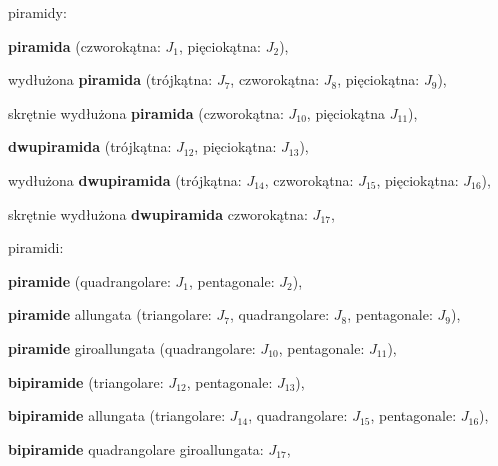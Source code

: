 \begin{compactitem}
    \item piramidy: \begin{compactitem} %
        \item \textbf{piramida} (czworokątna: $J_1$, pięciokątna: $J_2$), %
        \item wydłużona \textbf{piramida} (trójkątna: $J_7$, czworokątna: $J_8$, pięciokątna: $J_9$), %
        \item skrętnie wydłużona \textbf{piramida} (czworokątna: $J_{10}$, pięciokątna $J_{11}$), %
        \item \textbf{dwupiramida} (trójkątna: $J_{12}$, pięciokątna: $J_{13}$), %
        \item wydłużona \textbf{dwupiramida} (trójkątna: $J_{14}$, czworokątna: $J_{15}$, pięciokątna: $J_{16}$), %
        \item skrętnie wydłużona \textbf{dwupiramida} czworokątna: $J_{17}$, %
    \item piramidi: \begin{compactitem} %
        \item \textbf{piramide} (quadrangolare: $J_1$, pentagonale: $J_2$), %
        \item \textbf{piramide} allungata (triangolare: $J_7$, quadrangolare: $J_8$, pentagonale: $J_9$), %
        \item \textbf{piramide} giroallungata (quadrangolare: $J_{10}$, pentagonale: $J_{11}$), %
        \item \textbf{bipiramide} (triangolare: $J_{12}$, pentagonale: $J_{13}$), %
        \item \textbf{bipiramide} allungata (triangolare: $J_{14}$, quadrangolare: $J_{15}$, pentagonale: $J_{16}$), %
        \item \textbf{bipiramide} quadrangolare giroallungata: $J_{17}$, %
    \end{compactitem}


\end{compactitem}
\end{compactitem}
